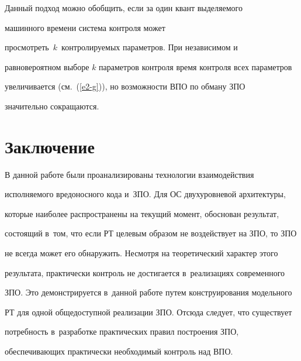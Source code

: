   Данный подход можно обобщить, если за один квант выделяемого 


машинного времени система контроля может 


просмотреть~$k$~контролируемых параметров. При независимом и~


равновероятном выборе $k$ параметров контроля время контроля всех параметров 


увеличивается (см.~(\ref{e2-g})), но возможности ВПО по обману ЗПО 


значительно сокращаются.











\section{Заключение}








  В данной работе были проанализированы технологии взаимодействия 


исполняемого вредоносного кода и~ЗПО. Для ОС двухуровневой архитектуры, 


которые наиболее распространены на текущий момент, обоснован результат, 


состоящий в~том, что если РТ целевым образом не воздействует на ЗПО, то ЗПО 


не всегда может его обнаружить. Несмотря на теоретический характер этого 


результата, практически контроль не достигается в~реализациях современного 


ЗПО. Это демонстрируется в~данной работе путем конструирования модельного 


РТ для одной общедоступной реализации ЗПО. Отсюда следует, что существует 


потребность в~разработке практических правил построения ЗПО, 


обеспечивающих практически необходимый контроль над ВПО. 








  


